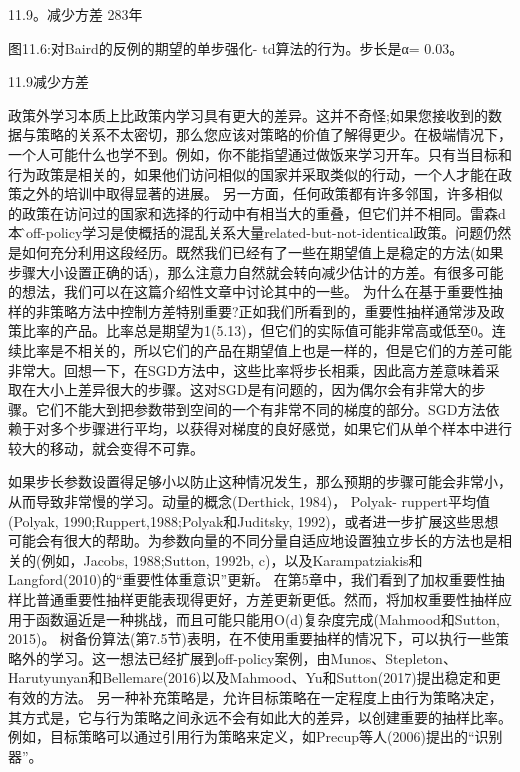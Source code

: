 11.9。减少方差 					283年
 

图11.6:对Baird的反例的期望的单步强化- td算法的行为。步长是α= 0.03。



11.9减少方差

政策外学习本质上比政策内学习具有更大的差异。这并不奇怪;如果您接收到的数据与策略的关系不太密切，那么您应该对策略的价值了解得更少。在极端情况下，一个人可能什么也学不到。例如，你不能指望通过做饭来学习开车。只有当目标和行为政策是相关的，如果他们访问相似的国家并采取类似的行动，一个人才能在政策之外的培训中取得显著的进展。
另一方面，任何政策都有许多邻国，许多相似的政策在访问过的国家和选择的行动中有相当大的重叠，但它们并不相同。雷森d本部̂off-policy学习是使概括的混乱关系大量related-but-not-identical政策。问题仍然是如何充分利用这段经历。既然我们已经有了一些在期望值上是稳定的方法(如果步骤大小设置正确的话)，那么注意力自然就会转向减少估计的方差。有很多可能的想法，我们可以在这篇介绍性文章中讨论其中的一些。
为什么在基于重要性抽样的非策略方法中控制方差特别重要?正如我们所看到的，重要性抽样通常涉及政策比率的产品。比率总是期望为1(5.13)，但它们的实际值可能非常高或低至0。连续比率是不相关的，所以它们的产品在期望值上也是一样的，但是它们的方差可能非常大。回想一下，在SGD方法中，这些比率将步长相乘，因此高方差意味着采取在大小上差异很大的步骤。这对SGD是有问题的，因为偶尔会有非常大的步骤。它们不能大到把参数带到空间的一个有非常不同的梯度的部分。SGD方法依赖于对多个步骤进行平均，以获得对梯度的良好感觉，如果它们从单个样本中进行较大的移动，就会变得不可靠。

如果步长参数设置得足够小以防止这种情况发生，那么预期的步骤可能会非常小，从而导致非常慢的学习。动量的概念(Derthick, 1984)， Polyak- ruppert平均值(Polyak, 1990;Ruppert,1988;Polyak和Juditsky, 1992)，或者进一步扩展这些思想可能会有很大的帮助。为参数向量的不同分量自适应地设置独立步长的方法也是相关的(例如，Jacobs, 1988;Sutton, 1992b, c)，以及Karampatziakis和Langford(2010)的“重要性体重意识”更新。
在第5章中，我们看到了加权重要性抽样比普通重要性抽样更能表现得更好，方差更新更低。然而，将加权重要性抽样应用于函数逼近是一种挑战，而且可能只能用O(d)复杂度完成(Mahmood和Sutton, 2015)。
树备份算法(第7.5节)表明，在不使用重要抽样的情况下，可以执行一些策略外的学习。这一想法已经扩展到off-policy案例，由Munos、Stepleton、Harutyunyan和Bellemare(2016)以及Mahmood、Yu和Sutton(2017)提出稳定和更有效的方法。
另一种补充策略是，允许目标策略在一定程度上由行为策略决定，其方式是，它与行为策略之间永远不会有如此大的差异，以创建重要的抽样比率。例如，目标策略可以通过引用行为策略来定义，如Precup等人(2006)提出的“识别器”。




